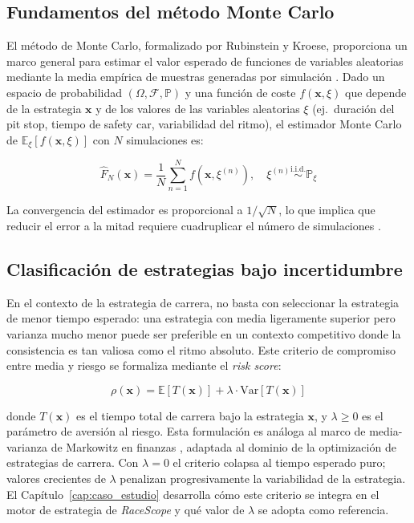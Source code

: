 \subsection{Fundamentos del método Monte Carlo}
\label{subsec:fundamentos_mc}

El método de Monte Carlo, formalizado por Rubinstein y Kroese, proporciona un marco general para estimar el valor esperado de funciones de variables aleatorias mediante la media empírica de muestras generadas por simulación \cite{rubinstein2016monte}. Dado un espacio de probabilidad $(\Omega, \mathcal{F}, \mathbb{P})$ y una función de coste $f(\mathbf{x}, \xi)$ que depende de la estrategia $\mathbf{x}$ y de los valores de las variables aleatorias $\xi$ (ej.~duración del pit stop, tiempo de safety car, variabilidad del ritmo), el estimador Monte Carlo de $\mathbb{E}_\xi[f(\mathbf{x}, \xi)]$ con $N$ simulaciones es:

\begin{equation}
    \hat{F}_N(\mathbf{x}) = \frac{1}{N} \sum_{n=1}^{N} f(\mathbf{x}, \xi^{(n)}), \quad \xi^{(n)} \overset{\text{i.i.d.}}{\sim} \mathbb{P}_\xi
\end{equation}

La convergencia del estimador es proporcional a $1/\sqrt{N}$, lo que implica que reducir el error a la mitad requiere cuadruplicar el número de simulaciones \cite{rubinstein2016monte}.

\subsection{Clasificación de estrategias bajo incertidumbre}
\label{subsec:clasificacion_estrategias}

En el contexto de la estrategia de carrera, no basta con seleccionar la estrategia de menor tiempo esperado: una estrategia con media ligeramente superior pero varianza mucho menor puede ser preferible en un contexto competitivo donde la consistencia es tan valiosa como el ritmo absoluto. Este criterio de compromiso entre media y riesgo se formaliza mediante el \textit{risk score}:

\begin{equation}
    \rho(\mathbf{x}) = \mathbb{E}[T(\mathbf{x})] + \lambda \cdot \mathrm{Var}[T(\mathbf{x})]
\end{equation}

donde $T(\mathbf{x})$ es el tiempo total de carrera bajo la estrategia $\mathbf{x}$, y $\lambda \geq 0$ es el parámetro de aversión al riesgo. Esta formulación es análoga al marco de media-varianza de Markowitz en finanzas \cite{markowitz1952portfolio}, adaptada al dominio de la optimización de estrategias de carrera. Con $\lambda = 0$ el criterio colapsa al tiempo esperado puro; valores crecientes de $\lambda$ penalizan progresivamente la variabilidad de la estrategia. El Capítulo~\ref{cap:caso_estudio} desarrolla cómo este criterio se integra en el motor de estrategia de \textit{RaceScope} y qué valor de $\lambda$ se adopta como referencia.

